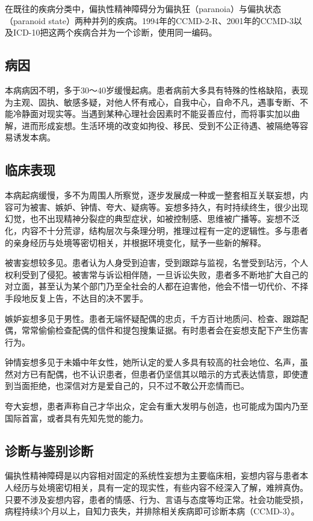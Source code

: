 在既往的疾病分类中，偏执性精神障碍分为偏执狂（paranoia）与偏执状态（paranoid
state）两种并列的疾病。1994年的CCMD-2-R、2001年的CCMD-3以及ICD-10把这两个疾病合并为一个诊断，使用同一编码。

\subsection{病因}

本病病因不明，多于30～40岁缓慢起病。患者病前大多具有特殊的性格缺陷，表现为主观、固执、敏感多疑，对他人怀有戒心，自我中心，自命不凡，遇事专断、不能冷静面对现实等。当遇到某种心理社会因素时不能妥善应付，而将事实加以曲解，进而形成妄想。生活环境的改变如拘役、移民、受到不公正待遇、被隔绝等容易诱发本病。

\subsection{临床表现}

本病起病缓慢，多不为周围人所察觉，逐步发展成一种或一整套相互关联妄想，内容可为被害、嫉妒、钟情、夸大、疑病等。妄想多持久，有时持续终生，很少出现幻觉，也不出现精神分裂症的典型症状，如被控制感、思维被广播等。妄想不泛化，内容不十分荒谬，结构层次与条理分明，推理过程有一定的逻辑性。多与患者的亲身经历与处境等密切相关，并根据环境变化，赋予一些新的解释。

被害妄想较多见。患者认为人身受到迫害，受到跟踪与监视，名誉受到玷污，个人权利受到了侵犯。被害常与诉讼相伴随，一旦诉讼失败，患者多不断地扩大自己的对立面，甚至认为某个部门乃至全社会的人都在迫害他，他会不惜一切代价、不择手段地反复上告，不达目的决不罢手。

嫉妒妄想多见于男性。患者无端怀疑配偶的忠贞，千方百计地质问、检查、跟踪配偶，常常偷偷检查配偶的信件和提包搜集证据。有时患者会在妄想支配下产生伤害行为。

钟情妄想多见于未婚中年女性，她所认定的爱人多具有较高的社会地位、名声，虽然对方已有配偶，也不认识患者，但患者仍坚信其以暗示的方式表达情意，即使遭到当面拒绝，也深信对方是爱自己的，只不过不敢公开恋情而已。

夸大妄想，患者声称自己才华出众，定会有重大发明与创造，也可能成为国内乃至国际首富，或者具有先知先觉的能力。

\subsection{诊断与鉴别诊断}

偏执性精神障碍是以内容相对固定的系统性妄想为主要临床相，妄想内容与患者本人经历与处境密切相关，具有一定的现实性，有些内容不经深入了解，难辨真伪。只要不涉及妄想内容，患者的情感、行为、言语与态度等均正常。社会功能受损，病程持续3个月以上，自知力丧失，并排除相关疾病即可诊断本病（CCMD-3）。

